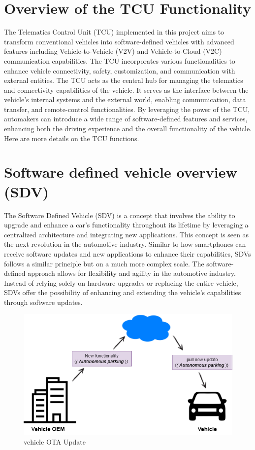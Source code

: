 \documentclass[
12pt,
oneside, 
onehalfspacing, 
nolistspacing, 
parskip, 
chapterinoneline, 
]{AASTCOMPUTER}
\begin{document}
\section{Overview of the TCU Functionality}
The Telematics Control Unit (TCU) implemented in this project aims to transform conventional vehicles into software-defined vehicles with advanced features including Vehicle-to-Vehicle (V2V) and Vehicle-to-Cloud (V2C) communication capabilities. The TCU incorporates various functionalities to enhance vehicle connectivity, safety, customization, and communication with external entities.
The TCU acts as the central hub for managing the telematics and connectivity capabilities of the vehicle. It serves as the interface between the vehicle's internal systems and the external world, enabling communication, data transfer, and remote-control functionalities. By leveraging the power of the TCU, automakers can introduce a wide range of software-defined features and services, enhancing both the driving experience and the overall functionality of the vehicle. Here are more details on the TCU functions.

\section{Software defined vehicle overview (SDV)}
The Software Defined Vehicle (SDV) is a concept that involves the ability to upgrade and enhance a car's functionality throughout its lifetime by leveraging a centralized architecture and integrating new applications. This concept is seen as the next revolution in the automotive industry. Similar to how smartphones can receive software updates and new applications to enhance their capabilities, SDVs follows a similar principle but on a much more complex scale. The software-defined approach allows for flexibility and agility in the automotive industry. Instead of relying solely on hardware upgrades or replacing the entire vehicle, SDVs offer the possibility of enhancing and extending the vehicle's capabilities through software updates. 

\begin{figure}[!ht]
\centering
\includegraphics[scale=0.5]{Figures/1.png}
\caption[vehicle OTA Update]{vehicle OTA Update}
\label{fig:TCU}
\end{figure}
\end{document}
